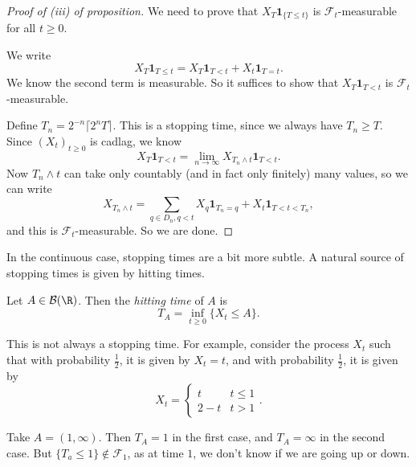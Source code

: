 \documentclass[a4paper]{article}
\begin{document}
\begin{proof}[Proof of (iii) of proposition]
  We need to prove that $X_T \mathbf{1}_{\{T \leq t\}}$ is $\mathcal{F}_t$-measurable for all $t \geq 0$.

  We write
  \[
    X_T\mathbf{1}_{T \leq t} = X_T \mathbf{1}_{T < t} + X_t \mathbf{1}_{T = t}.
  \]
  We know the second term is measurable. So it suffices to show that $X_T \mathbf{1}_{T < t}$ is $\mathcal{F}_t$-measurable.

  Define $T_n = 2^{-n} \lceil 2^n T\rceil$. This is a stopping time, since we always have $T_n \geq T$. Since $(X_t)_{t \geq 0}$ is cadlag, we know
  \[
    X_T \mathbf{1}_{T < t} = \lim_{n \to \infty} X_{T_n \wedge t} \mathbf{1}_{T < t}.
  \]
  Now $T_n \wedge t$ can take only countably (and in fact only finitely) many values, so we can write
  \[
    X_{T_n \wedge t} = \sum_{q \in D_n, q < t} X_{q} \mathbf{1}_{T_n = q} + X_t \mathbf{1}_{T < t < T_n},
  \]
  and this is $\mathcal{F}_t$-measurable. So we are done.
\end{proof}

In the continuous case, stopping times are a bit more subtle. A natural source of stopping times is given by hitting times.

\begin{defi}
  Let $A \in \mathcal{B}(\R)$. Then the \emph{hitting time} of $A$ is
  \[
    T_A = \inf_{t \geq 0} \{X_t \leq A\}.
  \]
\end{defi}

This is not always a stopping time. For example, consider the process $X_t$ such that with probability $\frac{1}{2}$, it is given by $X_t = t$, and with probability $\frac{1}{2}$, it is given by
\[
  X_t =
  \begin{cases}
    t & t \leq 1\\
    2 - t & t > 1
  \end{cases}.
\]
\begin{center}
\end{center}
Take $A = (1, \infty)$. Then $T_A = 1$ in the first case, and $T_A = \infty$ in the second case. But $\{T_a \leq 1\} \not \in \mathcal{F}_1$, as at time $1$, we don't know if we are going up or down.
\end{document}
